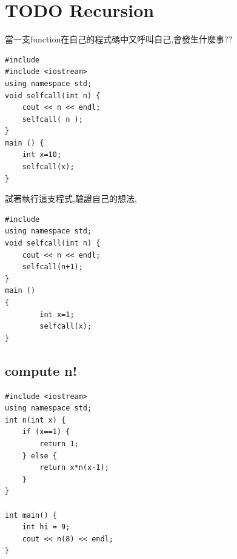 \documentclass[a4paper,12pt]{article}
\begin{document}
\section{{\bfseries\sffamily TODO} Recursion}
\label{cpp_functions}
當一支function在自己的程式碼中又呼叫自己,會發生什麼事??\\
\lstset{breaklines=true,language=cpp,label= ,caption= ,captionpos=b,firstnumber=1,numbers=left}
\begin{lstlisting}
#include
#include <iostream>
using namespace std;
void selfcall(int n) {
    cout << n << endl;
    selfcall( n );
}
main () {
    int x=10;
    selfcall(x);
}
\end{lstlisting}

試著執行這支程式,驗證自己的想法,\\
\lstset{breaklines=true,language=cpp,label= ,caption= ,captionpos=b,firstnumber=1,numbers=left}
\begin{lstlisting}
#include
using namespace std;
void selfcall(int n) {
    cout << n << endl;
    selfcall(n+1);
}
main ()
{
        int x=1;
        selfcall(x);
}
\end{lstlisting}

\subsection{compute n!}
\label{sec:orgddcebd1}
\lstset{breaklines=true,language=C++,label= ,caption= ,captionpos=b,numbers=none}
\begin{lstlisting}
#include <iostream>
using namespace std;
int n(int x) {
    if (x==1) {
        return 1;
    } else {
        return x*n(x-1);
    }
}

int main() {
    int hi = 9;
    cout << n(8) << endl;
}

\end{lstlisting}
\end{document}
